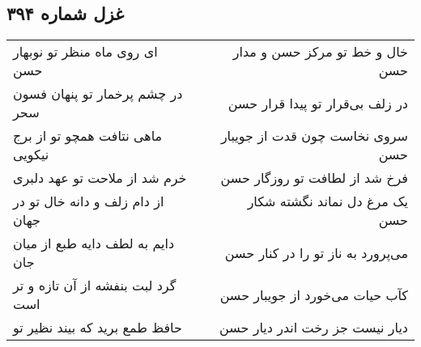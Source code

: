 \begin{center}
\section*{غزل شماره ۳۹۴}
\label{sec:sh394}
\begin{longtable}{l p{0.5cm} r}
ای روی ماه منظر تو نوبهار حسن
&&
خال و خط تو مرکز حسن و مدار حسن
\\
در چشم پرخمار تو پنهان فسون سحر
&&
در زلف بی‌قرار تو پیدا قرار حسن
\\
ماهی نتافت همچو تو از برج نیکویی
&&
سروی نخاست چون قدت از جویبار حسن
\\
خرم شد از ملاحت تو عهد دلبری
&&
فرخ شد از لطافت تو روزگار حسن
\\
از دام زلف و دانه خال تو در جهان
&&
یک مرغ دل نماند نگشته شکار حسن
\\
دایم به لطف دایه طبع از میان جان
&&
می‌پرورد به ناز تو را در کنار حسن
\\
گرد لبت بنفشه از آن تازه و تر است
&&
کآب حیات می‌خورد از جویبار حسن
\\
حافظ طمع برید که بیند نظیر تو
&&
دیار نیست جز رخت اندر دیار حسن
\\
\end{longtable}
\end{center}
